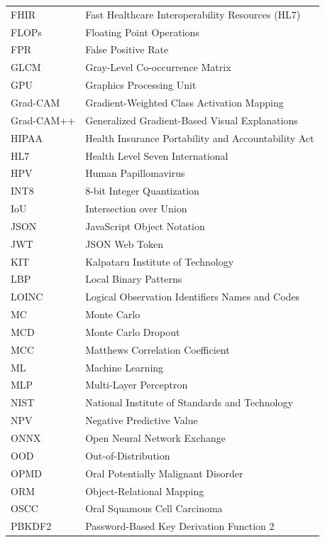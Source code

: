 \documentclass[12pt,a4paper,oneside]{report}
\begin{document}
\begin{longtable}{p{3.2cm} p{10.8cm}}
FHIR        & Fast Healthcare Interoperability Resources (HL7) \\
FLOPs       & Floating Point Operations \\
FPR         & False Positive Rate \\
GLCM        & Gray-Level Co-occurrence Matrix \\
GPU         & Graphics Processing Unit \\
Grad-CAM    & Gradient-Weighted Class Activation Mapping \\
Grad-CAM++  & Generalized Gradient-Based Visual Explanations \\
HIPAA       & Health Insurance Portability and Accountability Act \\
HL7         & Health Level Seven International \\
HPV         & Human Papillomavirus \\
INT8        & 8-bit Integer Quantization \\
IoU         & Intersection over Union \\
JSON        & JavaScript Object Notation \\
JWT         & JSON Web Token \\
KIT         & Kalpataru Institute of Technology \\
LBP         & Local Binary Patterns \\
LOINC       & Logical Observation Identifiers Names and Codes \\
MC          & Monte Carlo \\
MCD         & Monte Carlo Dropout \\
MCC         & Matthews Correlation Coefficient \\
ML          & Machine Learning \\
MLP         & Multi-Layer Perceptron \\
NIST        & National Institute of Standards and Technology \\
NPV         & Negative Predictive Value \\
ONNX        & Open Neural Network Exchange \\
OOD         & Out-of-Distribution \\
OPMD        & Oral Potentially Malignant Disorder \\
ORM         & Object-Relational Mapping \\
OSCC        & Oral Squamous Cell Carcinoma \\
PBKDF2      & Password-Based Key Derivation Function 2 \\

\end{longtable}
\end{document}
